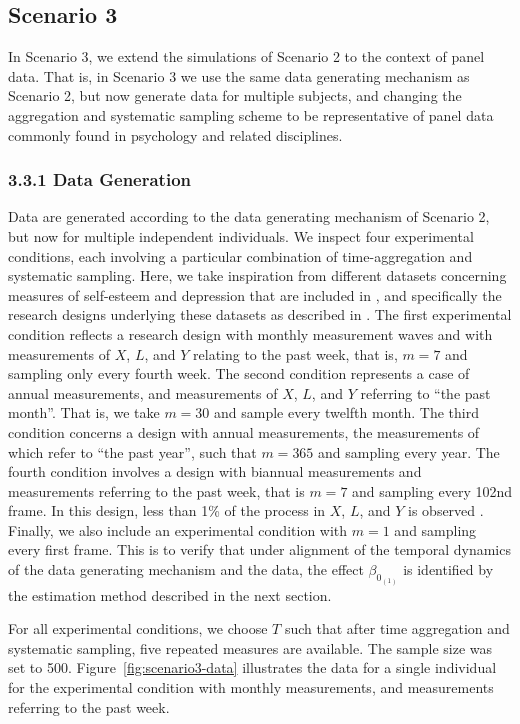 \documentclass[man]{apa7} %
\begin{document}
\subsection{Scenario 3}
In Scenario 3, we extend the simulations of Scenario 2 to the context of panel data. That is, in Scenario 3 we use the same data generating mechanism as Scenario 2, but now generate data for multiple subjects, and changing the aggregation and systematic sampling scheme to be representative of panel data commonly found in psychology and related disciplines. 

\subsubsection{3.3.1 Data Generation}
Data are generated according to the data generating mechanism of Scenario 2, but now for multiple independent individuals. We inspect four experimental conditions, each involving a particular combination of time-aggregation and systematic sampling. Here, we take inspiration from different datasets concerning measures of self-esteem and depression that are included in \textcite{orth_testing_2021}, and specifically the research designs underlying these datasets as described in \textcite{hamaker_within-between_2023}. The first experimental condition reflects a research design with monthly measurement waves and with measurements of $X$, $L$, and $Y$ relating to the past week, that is, $m = 7$ and sampling only every fourth week. The second condition represents a case of annual measurements, and measurements of $X$, $L$, and $Y$ referring to ``the past month''. That is, we take $m = 30$ and sample every twelfth month. The third condition concerns a design with annual measurements, the measurements of which refer to ``the past year'', such that $m = 365$ and sampling every year. The fourth condition involves a design with biannual measurements and measurements referring to the past week, that is $m = 7$ and sampling every 102nd frame. In this design, less than 1\% of the process in $X$, $L$, and $Y$ is observed \parencite{hamaker_within-between_2023}. Finally, we also include an experimental condition with $m = 1$ and sampling every first frame. This is to verify that under alignment of the temporal dynamics of the data generating mechanism and the data, the effect $\beta_{0_{(1)}}$ is identified by the estimation method described in the next section. 

For all experimental conditions, we choose $T$ such that after time aggregation and systematic sampling, five repeated measures are available. The sample size was set to 500. Figure~\ref{fig:scenario3-data} illustrates the data for a single individual for the experimental condition with monthly measurements, and measurements referring to the past week. 
\end{document}
